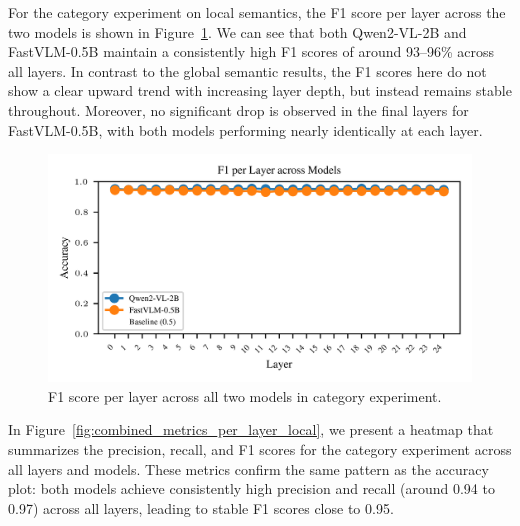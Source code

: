 \documentclass[11pt]{article}
\begin{document}
\noindent For the category experiment on local semantics, the F1 score per layer across the two models is shown in Figure~\ref{fig:f1_per_layer_local}.
We can see that both Qwen2-VL-2B and FastVLM-0.5B maintain a consistently high F1 scores of around 93--96\% across all layers.
In contrast to the global semantic results, the F1 scores here do not show a clear upward trend with increasing layer depth, but instead remains stable throughout.
Moreover, no significant drop is observed in the final layers for FastVLM-0.5B, with both models performing nearly identically at each layer.
\begin{figure}[H]
    \centering
    \includegraphics[width=1\linewidth]{figures/local/_combined_exp2/f1_lines_per_layer.png}
    \caption{F1 score per layer across all two models in category experiment.}
    \label{fig:f1_per_layer_local}
\end{figure}
\noindent In Figure~\ref{fig:combined_metrics_per_layer_local}, we present a heatmap that summarizes the precision, recall, and F1 scores for the category experiment across all layers and models.
These metrics confirm the same pattern as the accuracy plot: both models achieve consistently high precision and recall (around 0.94 to 0.97) across all layers, leading to stable F1 scores close to 0.95.
\end{document}
